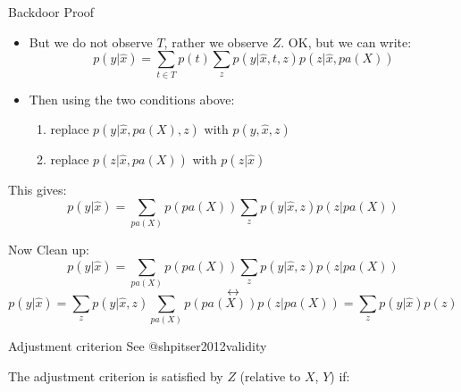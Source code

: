 \documentclass[
  11pt,
  ignorenonframetext,
]{beamer}
\providecommand{\tightlist}{%
  \setlength{\itemsep}{0pt}\setlength{\parskip}{0pt}}\usepackage{longtable,booktabs,array}
\begin{document}
\begin{frame}{Backdoor Proof}
\protect\hypertarget{backdoor-proof-1}{}
\begin{itemize}
\item
  But we do not observe \(T\), rather we observe \(Z\). OK, but we can
  write:
  \[p(y|\hat{x}) = \sum_{t\in T} p(t) \sum_z p(y|\hat{x}, t, z)p(z|\hat{x}, pa(X))\]
\item
  Then using the two conditions above:

  \begin{enumerate}
  \tightlist
  \item
    replace \(p(y|\hat{x}, pa(X), z)\) with \(p(y, \hat{x}, z)\)
  \item
    replace \(p(z|\hat{x}, pa(X))\) with \(p(z|\hat{x})\)
  \end{enumerate}
\end{itemize}

This gives:
\[p(y|\hat{x}) = \sum_{pa(X)} p(pa(X)) \sum_z p(y|\hat{x}, z)p(z|pa(X)) \]
\end{frame}

\begin{frame}{Now Clean up:}
\protect\hypertarget{now-clean-up}{}
\[p(y|\hat{x}) = \sum_{pa(X)} p(pa(X)) \sum_z p(y|\hat{x}, z)p(z|pa(X))\]
\[\leftrightarrow\]
\[p(y|\hat{x}) =  \sum_z p(y|\hat{x}, z)\sum_{pa(X)} p(pa(X))p(z|pa(X)) = \sum_z p(y|\hat{x})p(z)\]
\end{frame}

\begin{frame}{Adjustment criterion}
\protect\hypertarget{adjustment-criterion}{}
See @shpitser2012validity

The adjustment criterion is satisfied by \(Z\) (relative to \(X\),
\(Y\)) if:

\end{frame}
\end{document}
